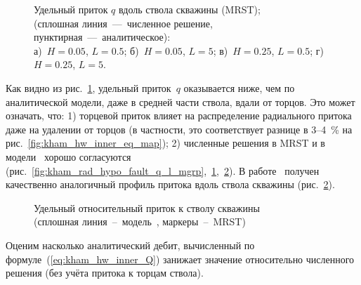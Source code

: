 \documentclass{article}
\begin{document}
\begin{figure}[H]
	\caption{
		Удельный приток $q$ вдоль ствола скважины (MRST); \\
		(сплошная линия~---~численное решение, пунктирная~---~аналитическое): \\
		а)~$H=0.05$, $L=0.5$; б)~$H=0.05$, $L=5$;
		в)~$H=0.25$, $L=0.5$; г)~$H=0.25$, $L=5$.
	}
	\label{fig:kham_rad_hypo_fault_q_l_mrst}
\end{figure}

Как видно из рис.~\ref{fig:kham_rad_hypo_fault_q_l_mrst}, удельный приток~$q$
оказывается ниже, чем по аналитической модели, даже в средней части ствола, вдали от торцов.
Это может означать, что: 1) торцевой приток влияет на распределение радиального притока
даже на удалении от торцов (в частности, это соответствует разнице в 3--4~\% на рис.~\ref{fig:kham_hw_inner_eq_map});
2) численные решения в MRST и в модели~\cite{lit:kham_mazo_uzku_2015} хорошо согласуются
(рис.~\ref{fig:kham_rad_hypo_fault_q_l_mgrp},~\ref{fig:kham_rad_hypo_fault_q_l_mrst},~\ref{fig:kham_well_along_ql_H015_L5_rw0001_mgrp_mrst}).
В работе~\cite{lit:kham_ozkan1999} получен качественно аналогичный профиль притока вдоль ствола скважины (рис.~\ref{fig:kham_well_along_ql_H015_L5_rw0001_mgrp_mrst}).

\begin{figure}[H]
	\centering
	
	\caption{Удельный относительный приток к стволу скважины \\
		(сплошная линия~--~модель~\cite{lit:kham_mazo_uzku_2015}, маркеры~--~MRST)}
	\label{fig:kham_well_along_ql_H015_L5_rw0001_mgrp_mrst}
\end{figure}

Оценим насколько аналитический дебит, вычисленный по формуле~(\ref{eq:kham_hw_inner_Q})
занижает значение относительно численного решения (без учёта притока к торцам ствола).
\end{document}
